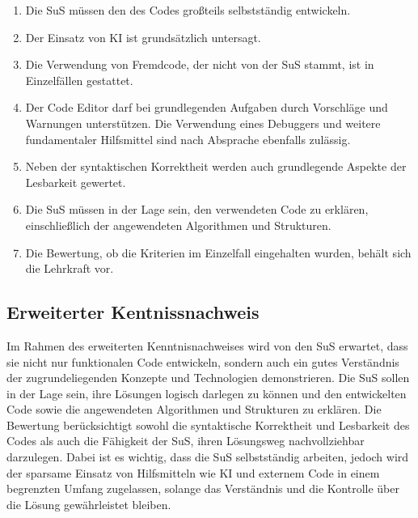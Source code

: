 \documentclass[a4paper,12pt]{article}
\begin{document}
\begin{enumerate}[label=\S\ \arabic*]
    \item Die SuS müssen den des Codes großteils selbstständig entwickeln.
    \item Der Einsatz von KI ist grundsätzlich untersagt.
    \item Die Verwendung von Fremdcode, der nicht von der SuS stammt, ist in Einzelfällen  gestattet.
    \item Der Code Editor darf bei grundlegenden Aufgaben durch Vorschläge und Warnungen unterstützen. Die Verwendung eines Debuggers und weitere fundamentaler Hilfsmittel sind nach Absprache ebenfalls zulässig.
    \item Neben der syntaktischen Korrektheit werden auch grundlegende Aspekte der Lesbarkeit gewertet.
    \item Die SuS müssen in der Lage sein, den verwendeten Code zu erklären, einschließlich der angewendeten Algorithmen und Strukturen.
    \item Die Bewertung, ob die Kriterien im Einzelfall eingehalten wurden, behält sich die Lehrkraft vor.
\end{enumerate}


\subsection{Erweiterter Kentnissnachweis}
Im Rahmen des erweiterten Kenntnisnachweises wird von den SuS erwartet, dass sie nicht nur funktionalen Code entwickeln, sondern auch ein gutes Verständnis der zugrundeliegenden Konzepte und Technologien demonstrieren. Die SuS sollen in der Lage sein, ihre Lösungen logisch darlegen zu können und den entwickelten Code sowie die angewendeten Algorithmen und Strukturen zu erklären. Die Bewertung berücksichtigt sowohl die syntaktische Korrektheit und Lesbarkeit des Codes als auch die Fähigkeit der SuS, ihren Lösungsweg nachvollziehbar darzulegen. Dabei ist es wichtig, dass die SuS selbstständig arbeiten, jedoch wird der sparsame Einsatz von Hilfsmitteln wie KI und externem Code in einem begrenzten Umfang zugelassen, solange das Verständnis und die Kontrolle über die Lösung gewährleistet bleiben.
\end{document}
